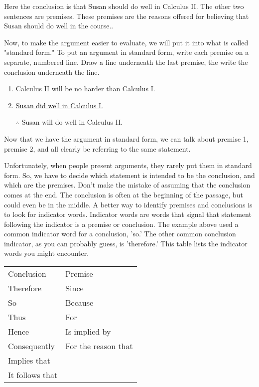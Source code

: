 \documentclass[../logic-text.tex]{subfiles}
\begin{document}
Here the conclusion is that Susan should do well in Calculus II.
The other two sentences are premises.
These premises are the reasons offered for believing that Susan should do well in the course..


Now, to make the argument easier to evaluate, we will put it into what is called "standard form." To put an argument in standard form, write each premise on a separate, numbered line. Draw a line underneath the last premise, the write the conclusion underneath the line.


\begin{enumerate}
\item Calculus II will be no harder than Calculus I.
\item \underline{Susan did well in Calculus I.}
\item [$\therefore$] Susan will do well in Calculus II.
\end{enumerate}

Now that we have the argument in standard form, we can talk about premise 1, premise 2, and all clearly be referring to the same statement.

Unfortunately, when people present arguments, they rarely put them in standard form. So, we have to decide which statement is intended to be the conclusion, and which are the premises. Don't make the mistake of assuming that the conclusion comes at the end. The conclusion is often at the beginning of the passage, but could even be in the middle. A better way to identify premises and conclusions is to look for indicator words. Indicator words are words that signal that statement following the indicator is a premise or conclusion. The example above used a common indicator word for a conclusion, 'so.' The other common conclusion indicator, as you can probably guess, is 'therefore.' This table lists the indicator words you might encounter.

\begin{table}[]
\begin{tabular}{@{}ll@{}}
Conclusion      & Premise             \\
Therefore       & Since               \\
So              & Because             \\
Thus            & For                 \\
Hence           & Is implied by       \\
Consequently    & For the reason that \\
Implies that    &                     \\
It follows that &                    
\end{tabular}
\end{table}
\end{document}
